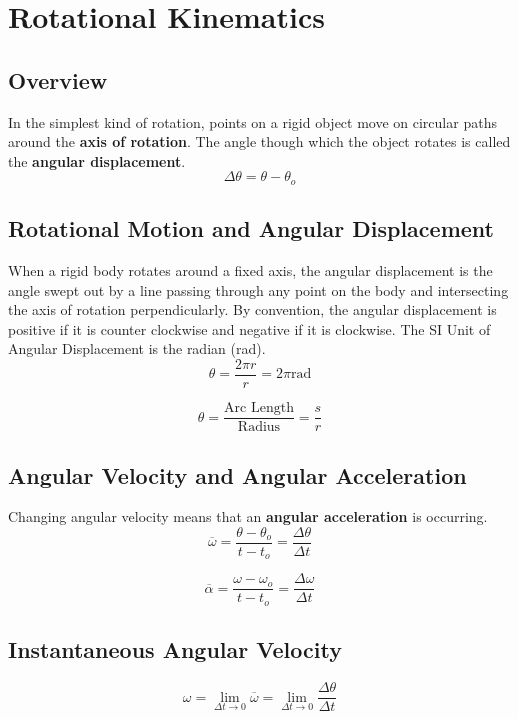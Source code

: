 \section{Rotational Kinematics}

\subsection{Overview}
In the simplest kind of rotation, points on a rigid object move on circular paths around the \textbf{axis of rotation}. The angle though which the object rotates is called the \textbf{angular displacement}. \[\Delta \theta = \theta - \theta_o\]

\subsection{Rotational Motion and Angular Displacement}
When a rigid body rotates around a fixed axis, the angular displacement is the angle swept out by a line passing through any point on the body and intersecting the axis of rotation perpendicularly. By convention, the angular displacement is positive if it is counter clockwise and negative if it is clockwise. The SI Unit of Angular Displacement is the radian (rad).
\[\theta = \frac{2\pi r}{r}=2\pi \text{rad}\]

\[\theta = \frac{\text{Arc Length}}{\text{Radius}}=\frac{s}{r}\]

\subsection{Angular Velocity and Angular Acceleration}
Changing angular velocity means that an \textbf{angular acceleration} is occurring. 
\[\overline{\omega} =\frac{\theta-\theta_o}{t-t_o}=\frac{\Delta \theta}{\Delta t}\]

\[\overline{\alpha}=\frac{\omega-\omega_o}{t-t_o}=\frac{\Delta \omega}{\Delta t}\]

\subsection{Instantaneous Angular Velocity}
\[\omega = \lim_{\Delta t\to 0}\overline{\omega}=\lim_{\Delta t\to 0}\frac{\Delta \theta}{\Delta t}\]

